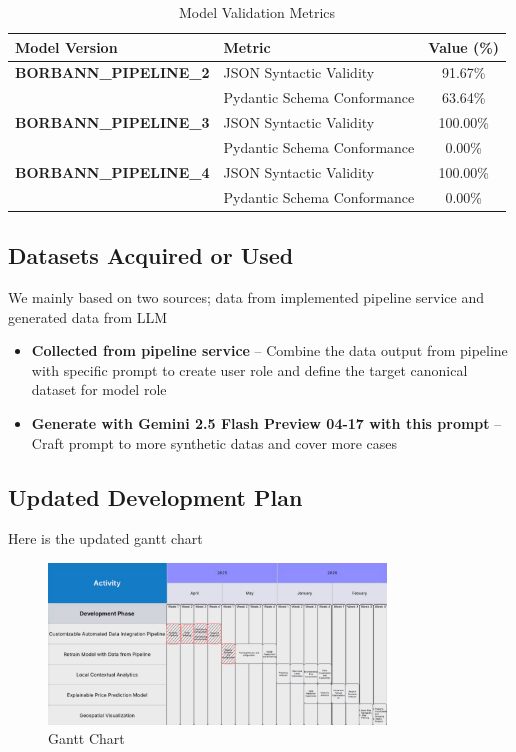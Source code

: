 \begin{table}[htbp]
    \centering
    \caption{Model Validation Metrics}
    \label{tab:model_comparison}
    \begin{tabular}{llc}
        \toprule
        \textbf{Model Version} & \textbf{Metric} & \textbf{Value (\%)} \\
        \midrule
        \textbf{BORBANN\_PIPELINE\_2} 
            & JSON Syntactic Validity & 91.67\% \\
            & Pydantic Schema Conformance & 63.64\% \\
        \midrule
        \textbf{BORBANN\_PIPELINE\_3} 
            & JSON Syntactic Validity & 100.00\% \\
            & Pydantic Schema Conformance & 0.00\% \\
        \midrule
        \textbf{BORBANN\_PIPELINE\_4} 
            & JSON Syntactic Validity & 100.00\% \\
            & Pydantic Schema Conformance & 0.00\% \\
        \bottomrule
    \end{tabular}
\end{table}

\subsection{Datasets Acquired or Used}

We mainly based on two sources; data from implemented pipeline service and generated data from LLM

\begin{itemize}
    \item \textbf{Collected from pipeline service} -- Combine the data output from pipeline with specific prompt to create user role and define the target canonical dataset for model role
    \item \textbf{Generate with Gemini 2.5 Flash Preview 04-17 with this prompt} -- Craft prompt to more synthetic datas and cover more cases
\end{itemize}

\subsection{Updated Development Plan}

Here is the updated gantt chart

\begin{figure}[H]
    \centering
    \includegraphics[width=0.8\textwidth]{assets/gant.png}
    \caption{Gantt Chart}
    \label{fig:gantt}
\end{figure}


